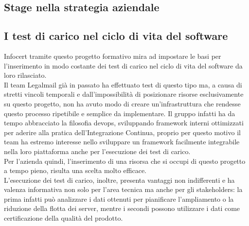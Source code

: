 \subsection{Stage nella strategia aziendale}
\subsection{I test di carico nel ciclo di vita del software}
Infocert tramite questo progetto formativo mira ad impostare le basi per l'inserimento in modo costante dei test di carico nel ciclo di vita del software da loro rilasciato. \\
Il team Legalmail già in passato ha effettuato test di questo tipo ma, a causa di stretti vincoli temporali e dall'impossibilità di posizionare risorse esclusivamente su questo progetto, non ha avuto modo di creare un'infrastruttura che rendesse questo processo ripetibile e semplice da implementare.  
Il gruppo infatti ha da tempo abbracciato la filosofia \gls{devops}, sviluppando \gls{framework} interni ottimizzati per aderire alla pratica dell'Integrazione Continua, proprio per questo motivo il team ha estremo interesse nello sviluppare un framework facilmente integrabile nella loro piattaforma anche per l'esecuzione dei test di carico. \\
Per l'azienda quindi, l'inserimento di una risorsa che si occupi di questo progetto a tempo pieno, risulta una scelta molto efficace. \\
L'esecuzione dei test di carico, inoltre, presenta vantaggi non indifferenti e ha valenza informativa non solo per l'area tecnica ma anche per gli \gls{stakeholders}: la prima infatti può analizzare i dati ottenuti per pianificare l'ampliamento o la riduzione della flotta dei server, mentre i secondi possono utilizzare i dati come certificazione della qualità del prodotto.